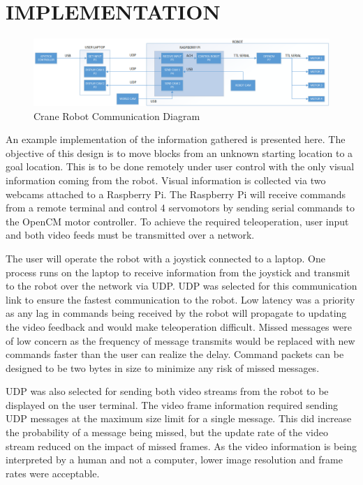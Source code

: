 \section{IMPLEMENTATION}
\begin{figure}[thpb]
 \centering
 \includegraphics[width=2.0\columnwidth]{./images/cranebot2.png}
  \caption{Crane Robot Communication Diagram}
  \label{fig:cranebot block}
\end{figure} 

An example implementation of the information gathered is presented here. The objective of this design is to move blocks from an unknown starting location to a goal location. This is to be done remotely under user control with the only visual information coming from the robot. Visual information is collected via two webcams attached to a Raspberry Pi. The Raspberry Pi will receive commands from a remote terminal and control 4 servomotors by sending serial commands to the OpenCM motor controller. To achieve the required teleoperation, user input and both video feeds must be transmitted over a network.

The user will operate the robot with a joystick connected to a laptop. One process runs on the laptop to receive information from the joystick and transmit to the robot over the network via UDP. UDP was selected for this communication link to ensure the fastest communication to the robot. Low latency was a priority as any lag in commands being received by the robot will propagate to updating the video feedback and would make teleoperation difficult. Missed messages were of low concern as the frequency of message transmits would be replaced with new commands faster than the user can realize the delay. Command packets can be designed to be two bytes in size to minimize any risk of missed messages.

UDP was also selected for sending both video streams from the robot to be displayed on the user terminal. The video frame information required sending UDP messages at the maximum size limit for a single message. This did increase the probability of a message being missed, but the update rate of the video stream reduced on the impact of missed frames. As the video information is being interpreted by a human and not a computer, lower image resolution and frame rates were acceptable.


